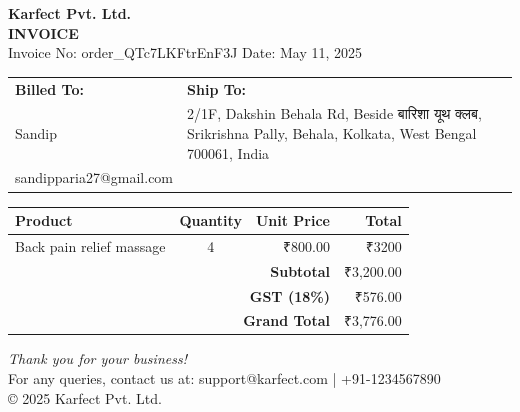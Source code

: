 \documentclass[a4paper,12pt]{article}
\begin{document}
    \begin{center}
        \textbf{\Large Karfect Pvt. Ltd.} \\
        \vspace{0.2cm}
        \textbf{INVOICE} \\
        \vspace{0.2cm}
        Invoice No: order\_QTc7LKFtrEnF3J \quad Date: May 11, 2025
    \end{center}

    \vspace{1cm}

    \begin{tabular}{@{}p{} p{}@{}}
        \textbf{Billed To:} & \textbf{Ship To:} \\
        Sandip & 2/1F, Dakshin Behala Rd, Beside बारिशा यूथ क्लब, Srikrishna Pally, Behala, Kolkata, West Bengal 700061, India \\
        sandipparia27@gmail.com & \\
    \end{tabular}

    \vspace{1cm}

    \begin{center}
        \begin{tabular}{|l|c|r|r|}
            \hline
            \textbf{Product} & \textbf{Quantity} & \textbf{Unit Price} & \textbf{Total} \\ \hline
            
            Back pain relief massage & 4 & ₹800.00 & ₹3200 \\ \hline
        
            \multicolumn{3}{|r|}{\textbf{Subtotal}} & ₹3,200.00 \\ \hline
            \multicolumn{3}{|r|}{\textbf{GST (18\%)}} & ₹576.00 \\ \hline
            \multicolumn{3}{|r|}{\textbf{Grand Total}} & ₹3,776.00 \\ \hline
        \end{tabular}
    \end{center}

    \vspace{1cm}

    \begin{center}
        \textit{Thank you for your business!} \\
        \vspace{0.5cm}
        For any queries, contact us at: support@karfect.com | +91-1234567890 \\
        © 2025 Karfect Pvt. Ltd.
    \end{center}

    
\end{document}

